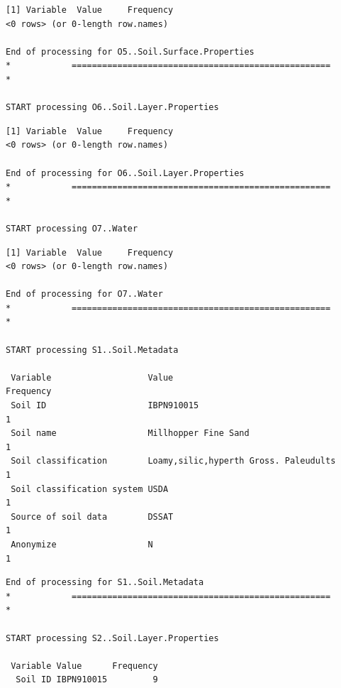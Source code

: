 \documentclass[
]{article}
\begin{document}
\begin{verbatim}
[1] Variable  Value     Frequency
<0 rows> (or 0-length row.names)

End of processing for O5..Soil.Surface.Properties
*            ===================================================            *

START processing O6..Soil.Layer.Properties
\end{verbatim}

\begin{verbatim}
[1] Variable  Value     Frequency
<0 rows> (or 0-length row.names)

End of processing for O6..Soil.Layer.Properties
*            ===================================================            *

START processing O7..Water
\end{verbatim}

\begin{verbatim}
[1] Variable  Value     Frequency
<0 rows> (or 0-length row.names)

End of processing for O7..Water
*            ===================================================            *

START processing S1..Soil.Metadata

 Variable                   Value                                 Frequency
 Soil ID                    IBPN910015                                    1
 Soil name                  Millhopper Fine Sand                          1
 Soil classification        Loamy,silic,hyperth Gross. Paleudults         1
 Soil classification system USDA                                          1
 Source of soil data        DSSAT                                         1
 Anonymize                  N                                             1
\end{verbatim}

\begin{verbatim}
End of processing for S1..Soil.Metadata
*            ===================================================            *

START processing S2..Soil.Layer.Properties

 Variable Value      Frequency
  Soil ID IBPN910015         9
\end{verbatim}
\end{document}
